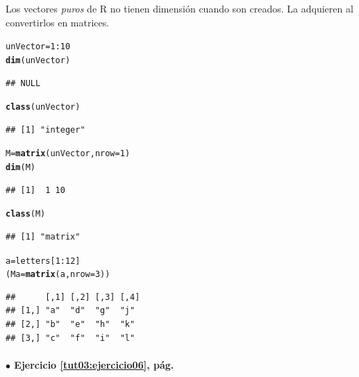 \documentclass[10pt,a4paper]{article}\usepackage[]{graphicx}\usepackage[]{color}
\makeatletter
\newcommand{\hlnum}[1]{\textcolor[rgb]{0.686,0.059,0.569}{#1}}%
\newcommand{\hlopt}[1]{\textcolor[rgb]{0,0,0}{#1}}%
\newcommand{\hlstd}[1]{\textcolor[rgb]{0.345,0.345,0.345}{#1}}%
\newcommand{\hlkwb}[1]{\textcolor[rgb]{0.69,0.353,0.396}{#1}}%
\newcommand{\hlkwc}[1]{\textcolor[rgb]{0.333,0.667,0.333}{#1}}%
\newcommand{\hlkwd}[1]{\textcolor[rgb]{0.737,0.353,0.396}{\textbf{#1}}}%
\newenvironment{kframe}{%
 \def\at@end@of@kframe{}%
 \ifinner\ifhmode%
  \def\at@end@of@kframe{\end{minipage}}%
  \begin{minipage}{\columnwidth}%
 \fi\fi%
 \def\FrameCommand##1{\hskip\@totalleftmargin \hskip-\fboxsep
 \colorbox{shadecolor}{##1}\hskip-\fboxsep
     \hskip-\linewidth \hskip-\@totalleftmargin \hskip\columnwidth}%
 \MakeFramed {\advance\hsize-\width
   \@totalleftmargin\z@ \linewidth\hsize
   \@setminipage}}%
 {\par\unskip\endMakeFramed%
 \at@end@of@kframe}
\newenvironment{knitrout}{}{} %
\makeatother
\begin{document}
Los vectores {\em puros} de R no tienen dimensión cuando son creados. La adquieren al convertirlos en matrices.
\begin{knitrout}
\color{fgcolor}\begin{kframe}
\begin{alltt}
\hlstd{unVector} \hlkwb{=} \hlnum{1}\hlopt{:}\hlnum{10}
\hlkwd{dim}\hlstd{(unVector)}
\end{alltt}
\begin{verbatim}
## NULL
\end{verbatim}
\begin{alltt}
\hlkwd{class}\hlstd{(unVector)}
\end{alltt}
\begin{verbatim}
## [1] "integer"
\end{verbatim}
\begin{alltt}
\hlstd{M} \hlkwb{=} \hlkwd{matrix}\hlstd{(unVector,} \hlkwc{nrow}\hlstd{=}\hlnum{1}\hlstd{)}
\hlkwd{dim}\hlstd{(M)}
\end{alltt}
\begin{verbatim}
## [1]  1 10
\end{verbatim}
\begin{alltt}
\hlkwd{class}\hlstd{(M)}
\end{alltt}
\begin{verbatim}
## [1] "matrix"
\end{verbatim}
\begin{alltt}
\hlstd{a}\hlkwb{=}\hlstd{letters[}\hlnum{1}\hlopt{:}\hlnum{12}\hlstd{]}
\hlstd{(Ma} \hlkwb{=} \hlkwd{matrix}\hlstd{(a,} \hlkwc{nrow}\hlstd{=}\hlnum{3}\hlstd{))}
\end{alltt}
\begin{verbatim}
##      [,1] [,2] [,3] [,4]
## [1,] "a"  "d"  "g"  "j" 
## [2,] "b"  "e"  "h"  "k" 
## [3,] "c"  "f"  "i"  "l"
\end{verbatim}
\end{kframe}
\end{knitrout}


\paragraph{\bf $\bullet$ Ejercicio \ref{tut03:ejercicio06}, pág. \pageref{tut03:ejercicio06}}
\label{tut03:ejercicio06:sol}\quad\\
\end{document}
